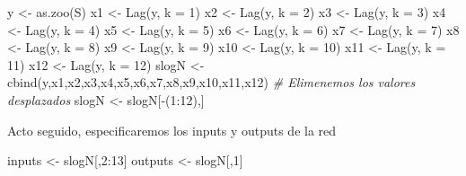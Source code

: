 \documentclass[
]{book}
\newenvironment{Shaded}{\begin{snugshade}}{\end{snugshade}}
\newcommand{\AttributeTok}[1]{\textcolor[rgb]{0.77,0.63,0.00}{#1}}
\newcommand{\CommentTok}[1]{\textcolor[rgb]{0.56,0.35,0.01}{\textit{#1}}}
\newcommand{\DecValTok}[1]{\textcolor[rgb]{0.00,0.00,0.81}{#1}}
\newcommand{\FunctionTok}[1]{\textcolor[rgb]{0.00,0.00,0.00}{#1}}
\newcommand{\NormalTok}[1]{#1}
\newcommand{\OtherTok}[1]{\textcolor[rgb]{0.56,0.35,0.01}{#1}}
\newcommand{\SpecialCharTok}[1]{\textcolor[rgb]{0.00,0.00,0.00}{#1}}
\begin{document}
\begin{Shaded}
\begin{Highlighting}[]
\NormalTok{y }\OtherTok{\textless{}{-}} \FunctionTok{as.zoo}\NormalTok{(S)}
\NormalTok{x1 }\OtherTok{\textless{}{-}} \FunctionTok{Lag}\NormalTok{(y, }\AttributeTok{k =} \DecValTok{1}\NormalTok{)}
\NormalTok{x2 }\OtherTok{\textless{}{-}} \FunctionTok{Lag}\NormalTok{(y, }\AttributeTok{k =} \DecValTok{2}\NormalTok{)}
\NormalTok{x3 }\OtherTok{\textless{}{-}} \FunctionTok{Lag}\NormalTok{(y, }\AttributeTok{k =} \DecValTok{3}\NormalTok{)}
\NormalTok{x4 }\OtherTok{\textless{}{-}} \FunctionTok{Lag}\NormalTok{(y, }\AttributeTok{k =} \DecValTok{4}\NormalTok{)}
\NormalTok{x5 }\OtherTok{\textless{}{-}} \FunctionTok{Lag}\NormalTok{(y, }\AttributeTok{k =} \DecValTok{5}\NormalTok{)}
\NormalTok{x6 }\OtherTok{\textless{}{-}} \FunctionTok{Lag}\NormalTok{(y, }\AttributeTok{k =} \DecValTok{6}\NormalTok{)}
\NormalTok{x7 }\OtherTok{\textless{}{-}} \FunctionTok{Lag}\NormalTok{(y, }\AttributeTok{k =} \DecValTok{7}\NormalTok{)}
\NormalTok{x8 }\OtherTok{\textless{}{-}} \FunctionTok{Lag}\NormalTok{(y, }\AttributeTok{k =} \DecValTok{8}\NormalTok{)}
\NormalTok{x9 }\OtherTok{\textless{}{-}} \FunctionTok{Lag}\NormalTok{(y, }\AttributeTok{k =} \DecValTok{9}\NormalTok{)}
\NormalTok{x10 }\OtherTok{\textless{}{-}} \FunctionTok{Lag}\NormalTok{(y, }\AttributeTok{k =} \DecValTok{10}\NormalTok{)}
\NormalTok{x11 }\OtherTok{\textless{}{-}} \FunctionTok{Lag}\NormalTok{(y, }\AttributeTok{k =} \DecValTok{11}\NormalTok{)}
\NormalTok{x12 }\OtherTok{\textless{}{-}} \FunctionTok{Lag}\NormalTok{(y, }\AttributeTok{k =} \DecValTok{12}\NormalTok{)}
\NormalTok{slogN }\OtherTok{\textless{}{-}} \FunctionTok{cbind}\NormalTok{(y,x1,x2,x3,x4,x5,x6,x7,x8,x9,x10,x11,x12)}
\CommentTok{\# Elimenemos los valores desplazados}
\NormalTok{slogN }\OtherTok{\textless{}{-}}\NormalTok{ slogN[}\SpecialCharTok{{-}}\NormalTok{(}\DecValTok{1}\SpecialCharTok{:}\DecValTok{12}\NormalTok{),]}
\end{Highlighting}
\end{Shaded}

Acto seguido, especificaremos los inputs y outputs de la red

\begin{Shaded}
\begin{Highlighting}[]
\NormalTok{inputs }\OtherTok{\textless{}{-}}\NormalTok{ slogN[,}\DecValTok{2}\SpecialCharTok{:}\DecValTok{13}\NormalTok{]}
\NormalTok{outputs }\OtherTok{\textless{}{-}}\NormalTok{ slogN[,}\DecValTok{1}\NormalTok{]}
\end{Highlighting}
\end{Shaded}
\end{document}
